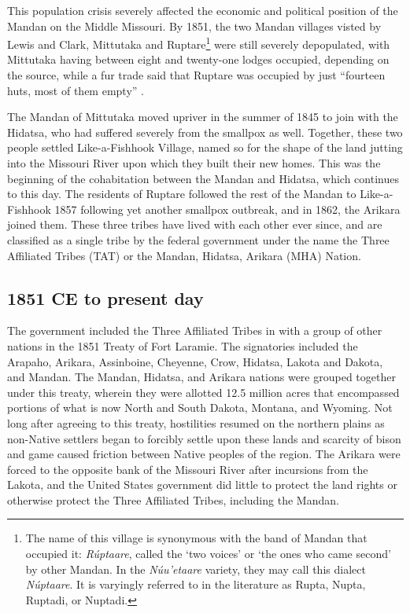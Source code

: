 This population crisis severely affected the economic and political position of the Mandan on the Middle Missouri. By 1851, the two Mandan villages visted by Lewis and Clark, Mittutaka and Ruptare\footnote{The name of this village is synonymous with the band of Mandan that occupied it: \textit{Rúptaare}, called the `two voices' or `the ones who came second' by other Mandan. In the \textit{Núu'etaare} variety, they may call this dialect \textit{Núptaare}. It is varyingly referred to in the literature as Rupta, Nupta, Ruptadi, or Nuptadi.} were still severely depopulated, with Mittutaka having between eight and twenty-one lodges occupied, depending on the source, while a fur trade said that Ruptare was occupied by just ``fourteen huts, most of them empty'' \citep[72]{kurz1937}.

The Mandan of Mittutaka moved upriver in the summer of 1845 to join with the Hidatsa, who had suffered severely from the smallpox as well. Together, these two people settled Like-a-Fishhook Village, named so for the shape of the land jutting into the Missouri River upon which they built their new homes. This was the beginning of the cohabitation between the Mandan and Hidatsa, which continues to this day. The residents of Ruptare followed the rest of the Mandan to Like-a-Fishhook 1857 following yet another smallpox outbreak, and in 1862, the Arikara joined them. These three tribes have lived with each other ever since, and are classified as a single tribe by the federal government under the name the Three Affiliated Tribes (TAT) or the Mandan, Hidatsa, Arikara (MHA) Nation.

\subsection{1851 CE to present day}\label{postlaramie}

The government included the Three Affiliated Tribes in with a group of other nations in the 1851 Treaty of Fort Laramie. The signatories included the Arapaho, Arikara, Assinboine, Cheyenne, Crow, Hidatsa, Lakota and Dakota, and Mandan. The Mandan, Hidatsa, and Arikara nations were grouped together under this treaty, wherein they were allotted 12.5 million acres that encompassed portions of what is now North and South Dakota, Montana, and Wyoming. Not long after agreeing to this treaty, hostilities resumed on the northern plains as non-Native settlers began to forcibly settle upon these lands and scarcity of bison and game caused friction between Native peoples of the region. The Arikara were forced to the opposite bank of the Missouri River after incursions from the Lakota, and the United States government did little to protect the land rights or otherwise protect the Three Affiliated Tribes, including the Mandan. 

